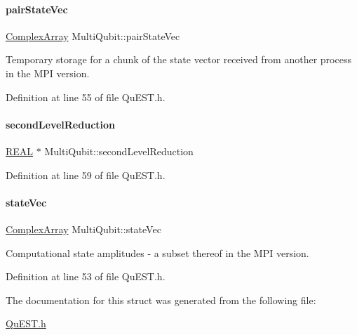 \paragraph{\texorpdfstring{pair\+State\+Vec}{pairStateVec}}
{\footnotesize\ttfamily \mbox{\hyperlink{structComplexArray}{Complex\+Array}} Multi\+Qubit\+::pair\+State\+Vec}



Temporary storage for a chunk of the state vector received from another process in the M\+PI version. 



Definition at line 55 of file Qu\+E\+S\+T.\+h.

\mbox{\label{structMultiQubit_a3e859cefa146ec7b30464ab3d897930b}} 
\paragraph{\texorpdfstring{second\+Level\+Reduction}{secondLevelReduction}}
{\footnotesize\ttfamily \mbox{\hyperlink{QuEST__precision_8h_a4b654506f18b8bfd61ad2a29a7e38c25}{R\+E\+AL}} $\ast$ Multi\+Qubit\+::second\+Level\+Reduction}



Definition at line 59 of file Qu\+E\+S\+T.\+h.

\mbox{\label{structMultiQubit_a45483190d6b01ef6b2f98f2bec9ab94f}} 
\paragraph{\texorpdfstring{state\+Vec}{stateVec}}
{\footnotesize\ttfamily \mbox{\hyperlink{structComplexArray}{Complex\+Array}} Multi\+Qubit\+::state\+Vec}



Computational state amplitudes -\/ a subset thereof in the M\+PI version. 



Definition at line 53 of file Qu\+E\+S\+T.\+h.



The documentation for this struct was generated from the following file\+:\begin{DoxyCompactItemize}
\item 
\mbox{\hyperlink{QuEST_8h}{Qu\+E\+S\+T.\+h}}\end{DoxyCompactItemize}
